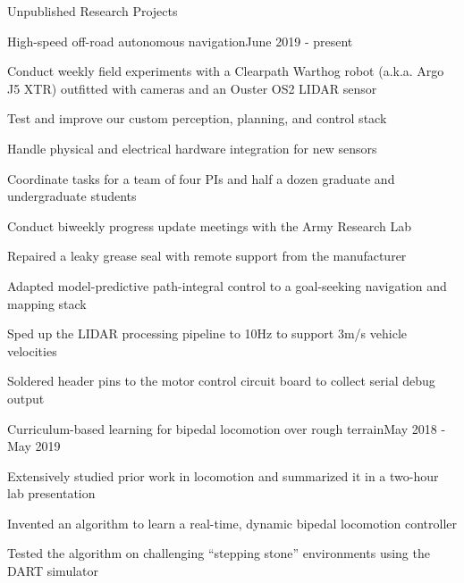 \documentclass{resume} %
\begin{document}
\begin{rSection}{Unpublished Research Projects}

\begin{rProject}{High-speed off-road autonomous navigation}{June 2019 - present}
\item Conduct weekly field experiments with a Clearpath Warthog robot (a.k.a. Argo J5 XTR) outfitted with cameras and an Ouster OS2 LIDAR sensor
\item Test and improve our custom perception, planning, and control stack
\item Handle physical and electrical hardware integration for new sensors
\item Coordinate tasks for a team of four PIs and half a dozen graduate and undergraduate students
\item Conduct biweekly progress update meetings with the Army Research Lab
\item Repaired a leaky grease seal with remote support from the manufacturer
\item Adapted model-predictive path-integral control to a goal-seeking navigation and mapping stack
\item Sped up the LIDAR processing pipeline to 10Hz to support 3m/s vehicle velocities
\item Soldered header pins to the motor control circuit board to collect serial debug output
\end{rProject}

\begin{rProject}{Curriculum-based learning for bipedal locomotion over rough terrain}{May 2018 - May 2019}
\item Extensively studied prior work in locomotion and summarized it in a two-hour lab presentation
\item Invented an algorithm to learn a real-time, dynamic bipedal locomotion controller
\item Tested the algorithm on challenging ``stepping stone'' environments using the DART simulator
\end{rProject}

\end{rSection}
\end{document}
